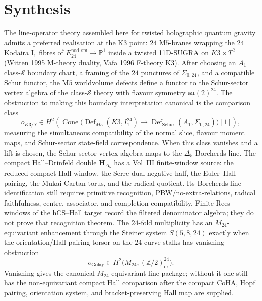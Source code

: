 \section{Synthesis}
\label{sec:line-operators-supplement}

\begin{remark}
\label{rem:line-operators-1}
The line-operator theory assembled here for twisted holographic quantum
gravity admits a preferred realisation at the K3 point:
$24$ M$5$-branes wrapping the $24$ Kodaira I$_1$ fibres of
$E^{\mathrm{nod,sm}}_{24}\to\mathbb P^1$ inside a twisted 11D-SUGRA on
$K3\times T^2$ (Witten 1995 M-theory duality, Vafa 1996 F-theory K3).
After choosing an $A_1$ class-$\mathcal S$ boundary chart, a framing of
the $24$ punctures of $\Sigma_{0,24}$, and a compatible Schur functor,
the M$5$ worldvolume defects define a functor to the Schur-sector
vertex algebra of the class-$\mathcal S$ theory with flavour symmetry
$\mathfrak{su}(2)^{24}$. The obstruction to making this boundary
interpretation canonical is the comparison class
\[
 o_{K3/\mathcal S}\in
 H^2\!\left(
 \operatorname{Cone}\bigl(
 \operatorname{Def}_{M5}(K3,I_1^{24})
 \longrightarrow
 \operatorname{Def}_{\mathrm{Schur}}(A_1,\Sigma_{0,24})
 \bigr)[1]\right),
\]
measuring the simultaneous compatibility of the normal slice, flavour
moment maps, and Schur-sector state-field correspondence. When this
class vanishes and a lift is chosen, the Schur-sector vertex algebra
maps to the $\Delta_5$ Borcherds line. The compact Hall--Drinfeld double
$\mathbf H_{\Delta_5}$ has a Vol~III finite-window source: the reduced
compact Hall window, the Serre-dual negative half, the Euler--Hall
pairing, the Mukai Cartan torus, and the radical quotient. Its
Borcherds-line identification still requires primitive recognition,
PBW/no-extra-relations, radical faithfulness, centre, associator, and
completion compatibility. Finite Rees windows of the hCS--Hall target
record the filtered denominator algebra; they do not prove that
recognition theorem. The $24$-fold
multiplicity has an $M_{24}$-equivariant enhancement through the
Steiner system $S(5,8,24)$ exactly when the orientation/Hall-pairing
torsor on the $24$ curve-stalks has vanishing obstruction
\[
 o_{\mathrm{Golay}}\in
 H^2\bigl(M_{24},(\mathbb Z/2)^{24}_{\mathrm{or}}\bigr).
\]
Vanishing gives the canonical $M_{24}$-equivariant line package;
without it one still has the non-equivariant compact Hall comparison
after the compact CoHA, Hopf pairing, orientation system, and
bracket-preserving Hall map are supplied.
\end{remark}

